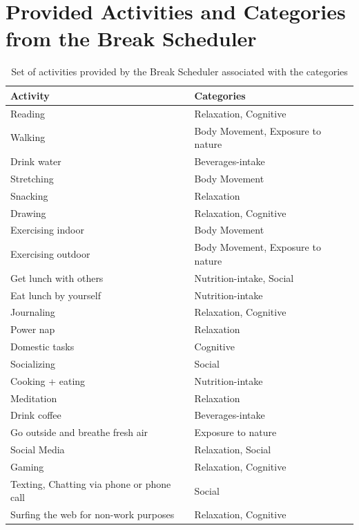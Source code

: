 \documentclass{hasel_thesis}
\begin{document}
\chapter{Provided Activities and Categories from the Break Scheduler}

\begin{table}[ht] 
\centering
    \begin{tabular}{ |p{7cm} p{7cm}|  }
    \hline
     Activity & Categories\\
     \hline
     \rowcolor{Gray}
     Reading &   Relaxation, Cognitive\\
     Walking &   Body Movement, Exposure to nature\\
     \rowcolor{Gray}
     Drink water &   Beverages-intake\\
     Stretching &   Body Movement\\
     \rowcolor{Gray}
     Snacking &   Relaxation\\
     Drawing &   Relaxation, Cognitive\\
     \rowcolor{Gray}
     Exercising indoor &   Body Movement\\
     Exercising outdoor &   Body Movement, Exposure to nature\\
     \rowcolor{Gray}
     Get lunch with others &   Nutrition-intake, Social\\
     Eat lunch by yourself &   Nutrition-intake\\
     \rowcolor{Gray}
     Journaling &   Relaxation, Cognitive\\
     Power nap &   Relaxation\\
     \rowcolor{Gray}
     Domestic tasks &   Cognitive\\
     Socializing &   Social\\
     \rowcolor{Gray}
     Cooking + eating &   Nutrition-intake\\
     Meditation &   Relaxation\\
     \rowcolor{Gray}
     Drink coffee &   Beverages-intake\\
     Go outside and breathe fresh air &   Exposure to nature\\
     \rowcolor{Gray}
     Social Media &   Relaxation, Social\\
     Gaming &   Relaxation, Cognitive\\
     \rowcolor{Gray}
     Texting, Chatting via phone or phone call &   Social\\
     Surfing the web for non-work purposes &   Relaxation, Cognitive\\
     \hline
    \end{tabular}
    \caption{Set of activities provided by the Break Scheduler associated with the categories}
 \label{table:activities_categories}
\end{table}
\end{document}
